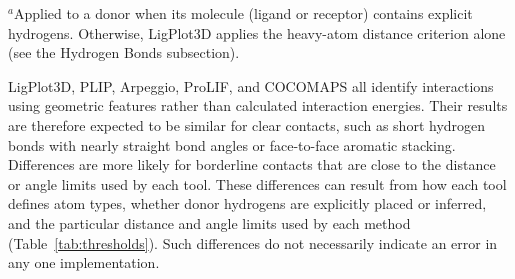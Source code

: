 \documentclass[journal=jacsat,manuscript=article]{achemso}
\begin{document}
\begin{table}[H]
\centering
\caption{LigPlot3D geometric thresholds compared with PLIP's default configuration \cite{salentin2015plip,schake2025plip}. The two tools are independently parameterized and their thresholds are not intended to be identical.}
\label{tab:thresholds}

\footnotesize $^{a}$Applied to a donor when its molecule (ligand or receptor) contains explicit hydrogens. Otherwise, LigPlot3D applies the heavy-atom distance criterion alone (see the Hydrogen Bonds subsection).
\end{table}

LigPlot3D, PLIP, Arpeggio, ProLIF, and COCOMAPS all identify interactions using geometric features rather than calculated interaction energies. Their results are therefore expected to be similar for clear contacts, such as short hydrogen bonds with nearly straight bond angles or face-to-face aromatic stacking. Differences are more likely for borderline contacts that are close to the distance or angle limits used by each tool. These differences can result from how each tool defines atom types, whether donor hydrogens are explicitly placed or inferred, and the particular distance and angle limits used by each method (Table~\ref{tab:thresholds}). Such differences do not necessarily indicate an error in any one implementation.
\end{document}
